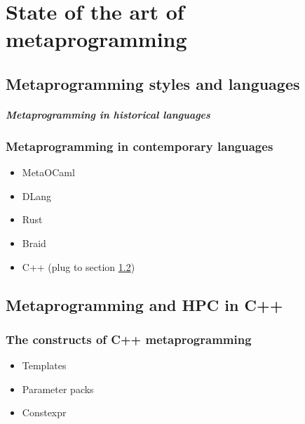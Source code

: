 \documentclass[../../main.tex]{subfiles}
\begin{document}

\chapter{State of the art of metaprogramming}

\section{Metaprogramming styles and languages}

\paragraph{Metaprogramming in historical languages}

\subsection{Metaprogramming in contemporary languages}

\begin{itemize}
\item MetaOCaml

\item DLang

\item Rust

\item Braid

\item C++ (plug to section \ref{lbl:meta-cpp})
\end{itemize}

\section{Metaprogramming and HPC in C++} \label{lbl:meta-cpp}

\subsection{The constructs of C++ metaprogramming}

\begin{itemize}
\item Templates

\item Parameter packs

\item Constexpr
\end{itemize}
\end{document}
